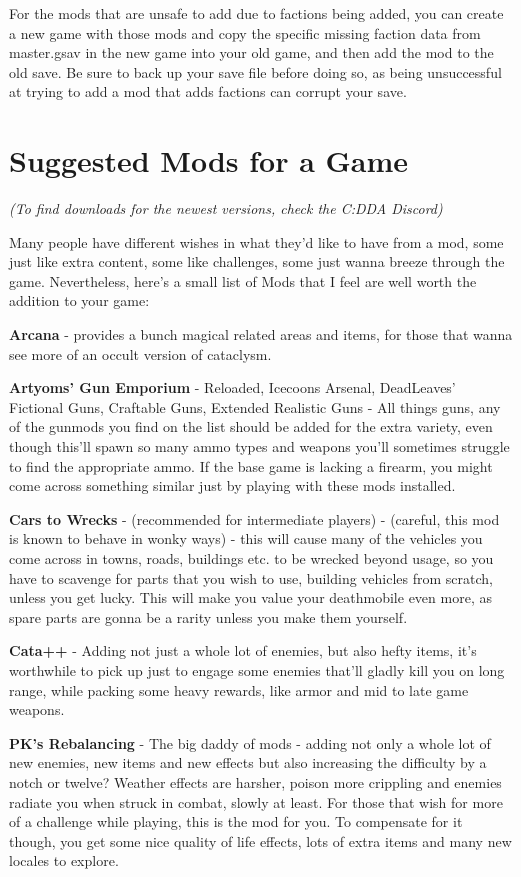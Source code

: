 For the mods that are unsafe to add due to factions being added, you can create a new game with those mods and copy the specific missing faction data from master.gsav in the new game into your old game, and then add the mod to the old save.  Be sure to back up your save file before doing so, as being unsuccessful at trying to add a mod that adds factions can corrupt your save.

\section{Suggested Mods for a Game}

\textit{(To find downloads for the newest versions, check the C:DDA Discord)}

Many people have different wishes in what they'd like to have from a mod, some just like extra content, some like challenges, some just wanna breeze through the game. Nevertheless, here's a small list of Mods that I feel are well worth the addition to your game:

\textbf{Arcana} - provides a bunch magical related areas and items, for those that wanna see more of an occult version of cataclysm.

\textbf{Artyoms' Gun Emporium} - Reloaded, Icecoons Arsenal, DeadLeaves' Fictional Guns, Craftable Guns, Extended Realistic Guns - All things guns, any of the gunmods you find on the list should be added for the extra variety, even though this'll spawn so many ammo types and weapons you'll sometimes struggle to find the appropriate ammo. If the base game is lacking a firearm, you might come across something similar just by playing with these mods installed.

\textbf{Cars to Wrecks} - (recommended for intermediate players) -
(careful, this mod is known to behave in wonky ways) - this will cause many of the vehicles you come across in towns, roads, buildings etc. to be wrecked beyond usage, so you have to scavenge for parts that you wish to use, building vehicles from scratch, unless you get lucky. This will make you value your deathmobile even more, as spare parts are gonna be a rarity unless you make them yourself.

\textbf{Cata++} - Adding not just a whole lot of enemies, but also hefty items, it's worthwhile to pick up just to engage some enemies that'll gladly kill you on long range, while packing some heavy rewards, like armor and mid to late game weapons.

\textbf{PK's Rebalancing} - The big daddy of mods - adding not only a whole lot of new enemies, new items and new effects but also increasing the difficulty by a notch or twelve? Weather effects are harsher, poison more crippling and enemies radiate you when struck in combat, slowly at least. For those that wish for more of a challenge while playing, this is the mod for you. To compensate for it though, you get some nice quality of life effects, lots of extra items and many new locales to explore.

